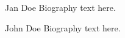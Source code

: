 \documentclass[journal]{IEEEtran}
\begin{document}


%
%
%
  

  
  

% 

\begin{IEEEbiography}{Jan Doe}
Biography text here.
\end{IEEEbiography}
\begin{IEEEbiographynophoto}{John Doe}
Biography text here.
\end{IEEEbiographynophoto}
\end{document}
